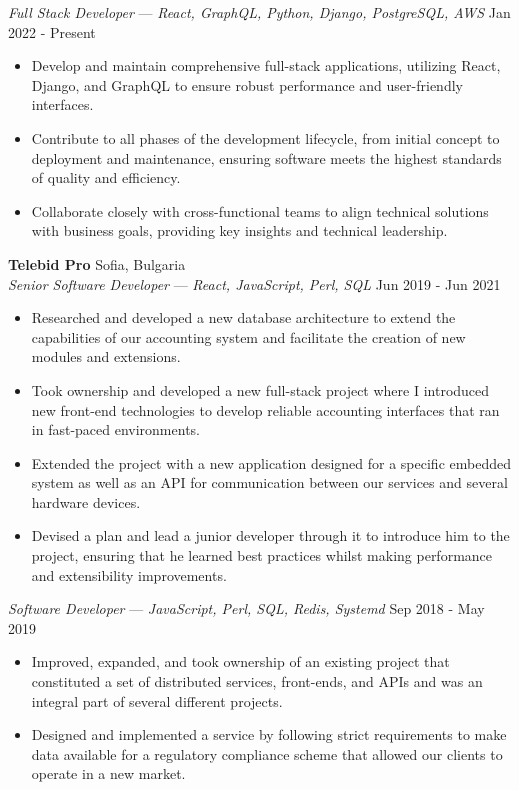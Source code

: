 \documentclass[a4paper]{article}
\begin{document}
\textit{Full Stack Developer} — {\sl React, GraphQL, Python, Django, PostgreSQL, AWS} \hfill Jan 2022 - Present\\
\vspace{-1mm}
\begin{itemize} \itemsep 1pt
    \item Develop and maintain comprehensive full-stack applications, utilizing React, Django, and GraphQL to ensure robust performance and user-friendly interfaces.
    \item Contribute to all phases of the development lifecycle, from initial concept to deployment and maintenance, ensuring software meets the highest standards of quality and efficiency.
    \item Collaborate closely with cross-functional teams to align technical solutions with business goals, providing key insights and technical leadership.
\end{itemize}

\textbf{Telebid Pro} \hfill Sofia, Bulgaria\\
\textit{Senior Software Developer}  — {\sl React, JavaScript, Perl, SQL}  \hfill Jun 2019 - Jun 2021\\
\vspace{-1mm}
\begin{itemize} \itemsep 1pt
    \item Researched and developed a new database architecture to extend the capabilities of our accounting system and facilitate the creation of new modules and extensions.
    \item Took ownership and developed a new full-stack project where I introduced new front-end technologies to develop reliable accounting interfaces that ran in fast-paced environments.
    \item Extended the project with a new application designed for a specific embedded system as well as an API for communication between our services and several hardware devices.
    \item Devised a plan and lead a junior developer through it to introduce him to the project, ensuring that he learned best practices whilst making performance and extensibility improvements.
\end{itemize}


\textit{Software Developer}  — {\sl JavaScript, Perl, SQL, Redis, Systemd} \hfill Sep 2018 - May 2019\\
\vspace{-1mm}
\begin{itemize} \itemsep 1pt
    \item Improved, expanded, and took ownership of an existing project that constituted a set of distributed services, front-ends, and APIs and was an integral part of several different projects.
    \item Designed and implemented a service by following strict requirements to make data available for a regulatory compliance scheme that allowed our clients to operate in a new market.
\end{itemize}
\end{document}
